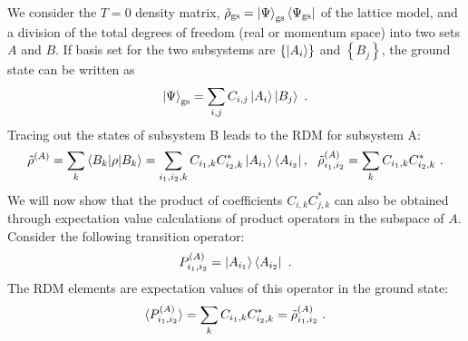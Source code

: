\documentclass[reprint,hidelinks,onecolumn]{revtex4-2}
\begin{document}
We consider the \(T=0\) density matrix, \(\tilde\rho_\text{gs} = \ket{\Psi}_\text{gs}\bra{{\Psi}_\text{gs}}\) of the lattice model, and a division of the total degrees of freedom (real or momentum space) into two sets \(A\) and \(B\). If basis set for the two subsystems are \(\left\{ \ket{A_i} \right\} \) and \(\left\{ B_j \right\} \), the ground state can be written as
\begin{equation}\begin{aligned}
	\ket{\Psi}_\text{gs} = \sum_{i,j}C_{i,j}\ket{A_i}\ket{B_j}~.
\end{aligned}\end{equation}
Tracing out the states of subsystem B leads to the RDM for subsystem A:
\begin{equation}\begin{aligned}
	\tilde \rho^{(A)} = \sum_k\braket{B_k | \rho | B_k} = \sum_{{i_1},{i_2}, k}C_{{i_1},k}C^*_{{i_2},k}\ket{A_{i_1}}\bra{A_{i_2}},~~\tilde \rho^{(A)}_{{i_1},{i_2}} = \sum_k C_{{i_1},k}C^*_{{i_2},k}~.
\end{aligned}\end{equation}
We will now show that the product of coefficients \(C_{i,k}C^*_{j,k}\) can also be obtained through expectation value calculations of product operators in the subspace of \(A\). Consider the following transition operator:
\begin{equation}\begin{aligned}
	P^{(A)}_{i_1,i_2} = \ket{A_{i_1}}\bra{A_{i_2}}~.
\end{aligned}\end{equation}
The RDM elements are expectation values of this operator in the ground state:
\begin{equation}\begin{aligned}
	\braket{P^{(A)}_{i_1,i_2}} = \sum_k C_{{i_1},k}C^*_{{i_2},k} = \tilde \rho^{(A)}_{{i_1},{i_2}}~.
\end{aligned}\end{equation}
\end{document}
